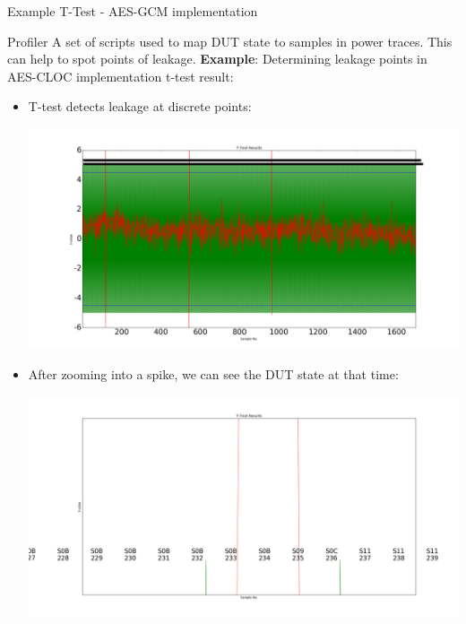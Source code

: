 \documentclass[xcolor=pdftex,dvipsnames,table,final]{beamer}
\begin{document}
\begin{frame}[fragile]{}
\begin{columns}[t]
\begin{column}{.31\linewidth}
\begin{block}{Example T-Test - AES-GCM implementation}
\begin{minipage}{0.5\linewidth}
        \end{minipage}
        
         
      \end{block}

      \begin{block}{Profiler}
         \vspace{-1ex}
         A set of scripts used to map DUT state to samples in power traces. This can help to spot points of leakage. \newline
         \textbf{Example}: Determining leakage points in AES-CLOC implementation t-test result:
         \begin{itemize}
         \item T-test detects leakage at discrete points:
          \begin{center}
          \includegraphics[scale=0.25]{images/profiler_1.png}
          \end{center}
          \item After zooming into a spike, we can see the DUT state at that time:
     \begin{center}
          \includegraphics[scale=0.25]{images/profiler_2.png}

\end{center}
\end{itemize}
\end{block}
\end{column}
\end{columns}
\end{frame}
\end{document}
